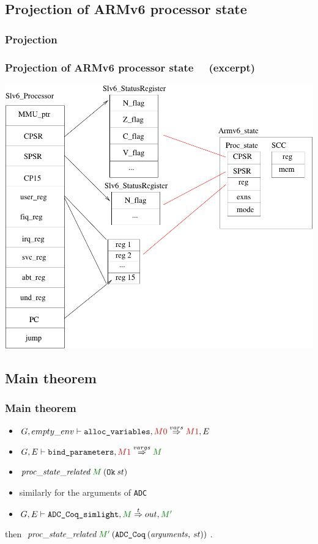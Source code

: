 \documentclass{beamer} %
\begin{document}
\subsection{Projection of ARMv6 processor state}
\begin{frame}
\frametitle{Projection}
\frametitle{Projection of ARMv6 processor state ~~(excerpt)}
\hfil\includegraphics[width=.8\linewidth]{projection.pdf}
\end{frame}

\subsection{Main theorem}
\begin{frame}
\frametitle{Main theorem}
\begin{theorem}
\begin{itemize}
\item $G,empty\_env\vdash \texttt{alloc\_variables},\brique{M0}\overset{vars}{\Rightarrow}\brique{M1},E$
\item $G,E \vdash \texttt{bind\_parameters},\brique{M1} \overset{vargs}{\Rightarrow}\cvert{M}$
\item $\mathit{proc\_state\_related} \: \cvert{M} \: (\texttt{Ok}\: st)$
\item similarly for the arguments of \texttt{ADC}
\item 
  $G,E\vdash \texttt{ADC\_Coq\_simlight},\cvert{M}\overset{t}{\Rightarrow}out,\cvert{M'}$
\end{itemize}
then $\mathit{proc\_state\_related}\: \cvert{M'} \:(\texttt{ADC\_Coq}\: (\mathit{arguments},\:st))$.
\end{theorem}
\end{frame}
\end{document}
